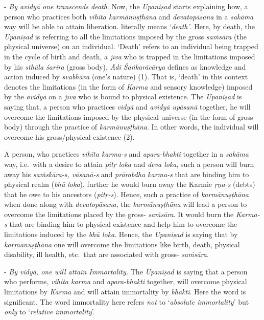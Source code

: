 - \emph{By avidyā one transcends death}. Now, the \emph{Upaniṣad} starts explaining how, a person who practices both \emph{vihita karmānuṣṭhāna} and \emph{devatopāsana} in a \emph{sakāma} way will be able to attain liberation.  literally means `\emph{death'}. Here, by death, the \emph{Upaniṣad} is referring to all the limitations imposed by the gross \emph{saṁsāra} (the physical universe) on an individual. `Death' refers to an individual being trapped in the cycle of birth and death, a \emph{jīva} who is trapped in the limitations imposed by his \emph{sthūla śarīra} (gross body). \emph{Ādi Śaṅkarācārya} defines  as knowledge and action induced by \emph{svabhāva} (one's nature) (1). That is, `death' in this context denotes the limitations (in the form of \emph{Karma} and sensory knowledge) imposed by the \emph{avidyā} on a \emph{jīva} who is bound to physical existence. The \emph{Upaniṣad} is saying that, a person who practices \emph{vidyā} and \emph{avidyā upāsanā} together, he will overcome the limitations imposed by the physical universe (in the form of gross body) through the practice of \emph{karmānuṣṭhāna}. In other words, the individual will overcome his gross/physical existence (2).

A person, who practices \emph{vihita karma-s} and \emph{apara-bhakti} together in a \emph{sakāma} way, i.e.\ with a desire to attain \emph{pitṛ loka} and \emph{deva loka}, such a person will burn away his \emph{saṁskāra-s, vāsanā-s} and \emph{prārabdha karma-s} that are binding him to physical realm (\emph{bhū loka}), further he would burn away the Karmic \emph{ṛṇa-s} (debts) that he owe to his ancestors (\emph{pitṛ-s}). Hence, such a practice of \emph{karmānuṣṭhāna} when done along with \emph{devatopāsana}, the \emph{karmānuṣṭhāna} will lead a person to overcome the limitations placed by the gross- \emph{saṁsāra}. It would burn the \emph{Karma-s} that are binding him to physical existence and help him to overcome the limitations induced by the \emph{bhū loka}. Hence, the \emph{Upaniṣad} is saying that by \emph{karmānuṣṭhāna} one will overcome the limitations like birth, death, physical disability, ill health, etc.\ that are associated with gross- \emph{saṁsāra}.

- \emph{By vidyā, one will attain Immortality.} The \emph{Upaniṣad} is saying that a person who performs, \emph{vihita karma} and \emph{apara-bhakti} together, will overcome physical limitations by \emph{Karma} and will attain immortality by \emph{bhakti}. Here the word  is significant. The word immortality here refers \emph{not} to `\emph{absolute immortality}' but \emph{only} to `\emph{relative immortality}'.

